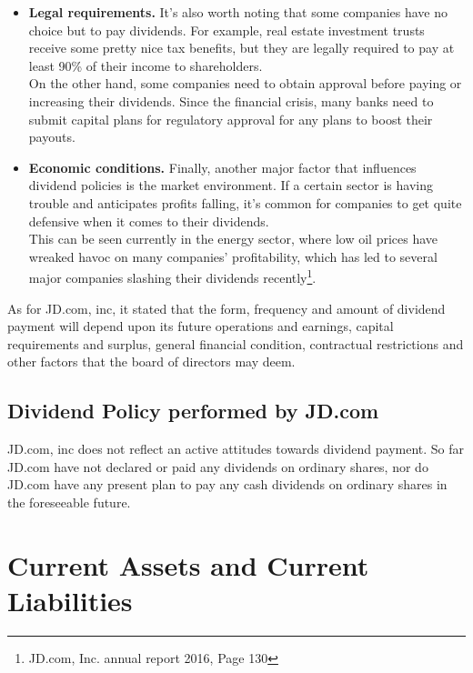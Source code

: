 \begin{itemize}
	\item \textbf{Legal requirements.} 
	It's also worth noting that some companies have no choice but to pay dividends. For example, real estate investment trusts receive some pretty nice tax benefits, but they are legally required to pay at least 90\% of their income to shareholders.\\
	On the other hand, some companies need to obtain approval before paying or increasing their dividends. Since the financial crisis, many banks need to submit capital plans for regulatory approval for any plans to boost their payouts.
	
	\item \textbf{Economic conditions.}
	Finally, another major factor that influences dividend policies is the market environment. If a certain sector is having trouble and anticipates profits falling, it's common for companies to get quite defensive when it comes to their dividends.\\	
	This can be seen currently in the energy sector, where low oil prices have wreaked havoc on many companies' profitability, which has led to several major companies slashing their dividends recently\footnote{JD.com, Inc. annual report 2016, Page 130}.
\end{itemize}

As for JD.com, inc, it stated that the form, frequency and amount of dividend payment will depend upon its future operations and earnings, capital requirements and surplus, general financial condition, contractual restrictions and other factors that the board of directors may deem.


\section{Dividend Policy performed by JD.com}
JD.com, inc does not reflect an active attitudes towards dividend payment. So far JD.com have not declared or paid any dividends on ordinary shares, nor do JD.com have any present plan to pay any cash dividends on ordinary shares in the foreseeable future.





\chapter{Current Assets and Current Liabilities}

